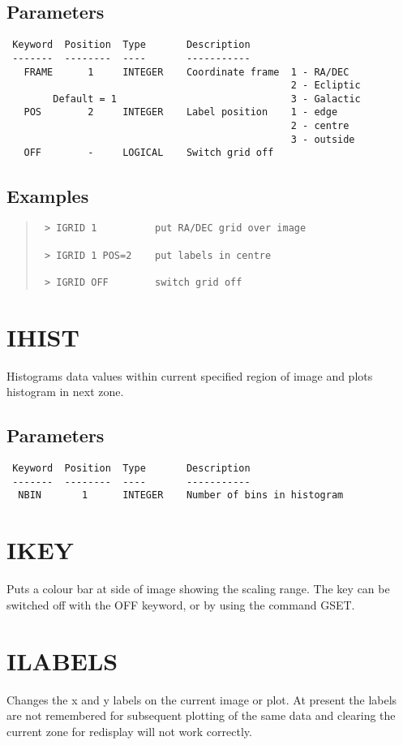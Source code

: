\documentclass{book}
\renewcommand{\_}{{\tt\char'137}}     %
\begin{document}
\subsection{Parameters}
\begin{verbatim}
 Keyword  Position  Type       Description
 -------  --------  ----       -----------
   FRAME      1     INTEGER    Coordinate frame  1 - RA/DEC
                                                 2 - Ecliptic
        Default = 1                              3 - Galactic
   POS        2     INTEGER    Label position    1 - edge
                                                 2 - centre
                                                 3 - outside
   OFF        -     LOGICAL    Switch grid off
\end{verbatim}\subsection{Examples}
\begin{quote}\begin{verbatim}
 > IGRID 1          put RA/DEC grid over image

 > IGRID 1 POS=2    put labels in centre

 > IGRID OFF        switch grid off
 \end{verbatim}\end{quote}
\section{IHIST}
Histograms data values within current specified region of image
and plots histogram in next zone.

\subsection{Parameters}
\begin{verbatim}
 Keyword  Position  Type       Description
 -------  --------  ----       -----------
  NBIN       1      INTEGER    Number of bins in histogram

\end{verbatim}\section{IKEY}
Puts a colour bar at side of image showing the scaling range.
The key can be switched off with the OFF keyword, or by using
the command GSET.

\section{ILABELS}
Changes the x and y labels on the current image or plot. At
present the labels are not remembered for subsequent plotting
of the same data and clearing the current zone for redisplay
will not work correctly.
\end{document}
